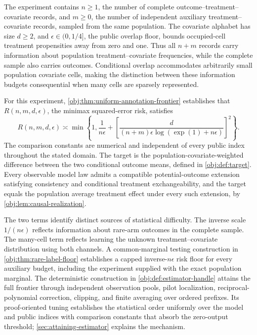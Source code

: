 The experiment contains \(n\ge1\), the number of complete outcome--treatment--covariate records, and \(m\ge0\), the number of independent auxiliary treatment--covariate records, sampled from the same population. The covariate alphabet has size \(d\ge2\), and \(\epsilon\in(0,1/4]\), the public overlap floor, bounds occupied-cell treatment propensities away from zero and one. Thus all \(n+m\) records carry information about population treatment--covariate frequencies, while the complete sample also carries outcomes. Conditional overlap accommodates arbitrarily small population covariate cells, making the distinction between these information budgets consequential when many cells are sparsely represented.

For this experiment, \cref{obj:thm:uniform-annotation-frontier} establishes that \(R(n,m,d,\epsilon)\), the minimax squared-error risk, satisfies
\[
R(n,m,d,\epsilon)
\asymp
\min\left\{
1,\frac{1}{n\epsilon}
+\left[
\frac{d}{(n+m)\epsilon\log(\exp(1)+n\epsilon)}
\right]^2
\right\}.
\]
The comparison constants are numerical and independent of every public index throughout the stated domain. The target is the population-covariate-weighted difference between the two conditional outcome means, defined in \cref{obj:def:target}. Every observable model law admits a compatible potential-outcome extension satisfying consistency and conditional treatment exchangeability, and the target equals the population average treatment effect under every such extension, by \cref{obj:lem:causal-realization}.

The two terms identify distinct sources of statistical difficulty. The inverse scale \(1/(n\epsilon)\) reflects information about rare-arm outcomes in the complete sample. The many-cell term reflects learning the unknown treatment--covariate distribution using both channels. A common-marginal testing construction in \cref{obj:thm:rare-label-floor} establishes a capped inverse-\(n\epsilon\) risk floor for every auxiliary budget, including the experiment supplied with the exact population marginal. The deterministic construction in \cref{obj:def:estimator-handle} attains the full frontier through independent observation pools, pilot localization, reciprocal-polynomial correction, clipping, and finite averaging over ordered prefixes. Its proof-oriented tuning establishes the statistical order uniformly over the model and public indices with comparison constants that absorb the zero-output threshold; \cref{sec:attaining-estimator} explains the mechanism.

